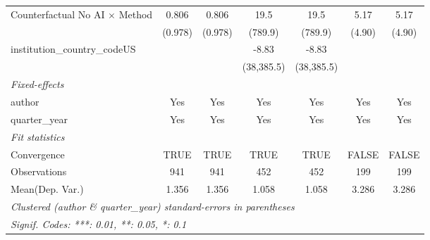 \begin{tabular}{lcccccc}
   Counterfactual No AI $\times$ Method  & 0.806       & 0.806       & 19.5        & 19.5        & 5.17        & 5.17\\   
                                         & (0.978)     & (0.978)     & (789.9)     & (789.9)     & (4.90)      & (4.90)\\   
   institution\_country\_codeUS          &             &             & -8.83       & -8.83       &             &   \\   
                                         &             &             & (38,385.5)  & (38,385.5)  &             &   \\   
   \midrule
   \emph{Fixed-effects}\\
   author                                & Yes         & Yes         & Yes         & Yes         & Yes         & Yes\\  
   quarter\_year                         & Yes         & Yes         & Yes         & Yes         & Yes         & Yes\\  
   \midrule
   \emph{Fit statistics}\\
   Convergence                           &TRUE         & TRUE        & TRUE        & TRUE        & FALSE       & FALSE\\  
   Observations                          & 941         & 941         & 452         & 452         & 199         & 199\\  
Mean(Dep. Var.) & 1.356 & 1.356 & 1.058 & 1.058 & 3.286 & 3.286 \\
   \midrule \midrule
   \multicolumn{7}{l}{\emph{Clustered (author \& quarter\_year) standard-errors in parentheses}}\\
   \multicolumn{7}{l}{\emph{Signif. Codes: ***: 0.01, **: 0.05, *: 0.1}}\\
\end{tabular}
\par\endgroup
